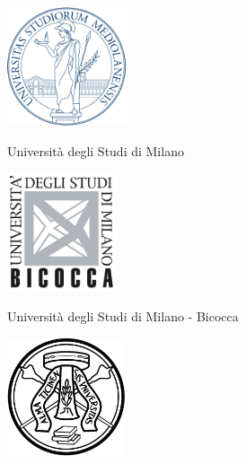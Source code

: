 \frenchspacing
\frontmatter


\begin{titlepage}

\thispagestyle{empty}

\begin{center}
\vskip 1cm

\begin{center}%
\begin{minipage}[t]{4cm}%
\begin{center}
\includegraphics[height=3.5cm]{logos/logo-unimi}%

\Large Universit\`a degli Studi di Milano
\end{center}
\end{minipage}%
\begin{minipage}[t]{6cm}%
\begin{center}
\includegraphics[height=3.5cm]{logos/logo-unimib}%

\Large Universit\`a degli Studi di Milano - Bicocca
\end{center}
\end{minipage}%
\begin{minipage}[t]{4cm}%
\begin{center}
\includegraphics[height=3.5cm]{logos/logo-unipv-bw}


\end{center}
\end{minipage}
\end{center}
\end{center}
\end{titlepage}
